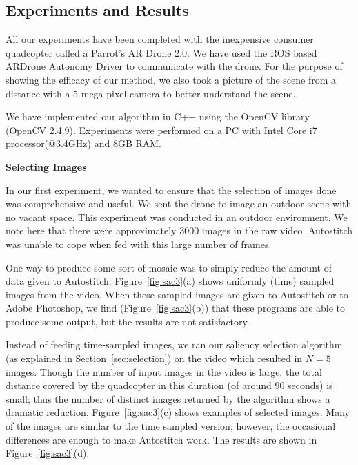 \documentclass[11pt]{article}
\begin{document}
\subsection{Experiments and Results}
\label{sec:results}

All our experiments have been completed with the inexpensive consumer
quadcopter called a Parrot's AR Drone 2.0. We have used the ROS based
ARDrone Autonomy Driver to communicate with the drone. For the purpose
of showing the efficacy of our method, we also took a picture of the
scene from a distance with a 5 mega-pixel camera to better understand
the scene.

We have implemented our algorithm in C++ using the OpenCV library
(OpenCV 2.4.9). Experiments were performed on a PC with Intel Core i7
processor(@3.4GHz) and 8GB RAM.

\noindent\textbf{Selecting Images}

In our first experiment, we wanted to ensure that the selection of
images done was comprehensive and useful.  We sent the drone to image 
an outdoor scene with no vacant space. This experiment was conducted
in an outdoor environment. We note here that there were approximately
3000 images in the raw video.  Autostitch was unable to cope  when fed
with this large number of frames.

One way to produce some sort of mosaic was to simply reduce the amount
of data given to Autostitch.  Figure~\ref{fig:sac3}(a) shows uniformly
(time) sampled images from the video.  When these sampled images are
given to Autostitch or to Adobe Photoshop, we find
(Figure~\ref{fig:sac3}(b)) that these programs are able to produce
some output, but the results are not satisfactory.

Instead of feeding time-sampled images, we ran our saliency selection
algorithm (as explained in Section~\ref{sec:selection}) on the video
which resulted in $N = 5$ images.  Though the number of input images
in the video is large, the total distance covered by the quadcopter in
this duration (of around 90 seconds) is small; thus the
number of distinct images returned by the algorithm shows a dramatic
reduction. Figure~\ref{fig:sac3}(c) shows examples of selected images.
Many of the images are similar to the time sampled version; however,
the occasional differences are enough to make Autostitch work. The
results are shown in Figure~\ref{fig:sac3}(d).
\end{document}
